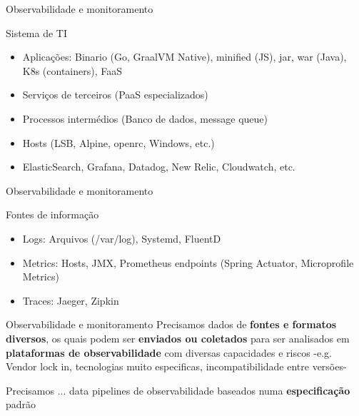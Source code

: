 \documentclass[aspectratio=169]{beamer}
\begin{document}
\begin{frame}{Observabilidade e monitoramento}
	
			Sistema de TI {\Huge \faServer}
			\begin{itemize}
				\item Aplicações: Binario (Go, GraalVM Native), minified (JS), jar, war (Java), K8s (containers), FaaS
				\item Serviços de terceiros (PaaS especializados)
				\item Processos intermédios (Banco de dados, message queue)
				\item Hosts (LSB, Alpine, openrc, Windows, etc.)
				\item ElasticSearch, Grafana, Datadog, New Relic, Cloudwatch, etc.
			\end{itemize}
	
\end{frame}

\begin{frame}{Observabilidade e monitoramento}
	
	Fontes de informação {\Huge	 \faBinoculars}
	\begin{itemize}
		\item Logs: Arquivos (/var/log), Systemd, FluentD
		\item Metrics: Hosts, JMX, Prometheus endpoints (Spring Actuator, Microprofile Metrics) 
		\item Traces: Jaeger, Zipkin
	\end{itemize}
	
\end{frame}

\begin{frame}{Observabilidade e monitoramento}
		Precisamos dados de \textbf{fontes e formatos diversos}, os quais podem ser \textbf{enviados ou coletados} para ser analisados em \textbf{plataformas de observabilidade} com diversas capacidades e riscos -e.g. Vendor lock in, tecnologias muito especificas, incompatibilidade entre versões- 
	
	\begin{alertblock}{Precisamos ...}
	data pipelines de observabilidade baseados numa \textbf{especificação} padrão
	\end{alertblock}
	
\end{frame}
	
\end{document}
